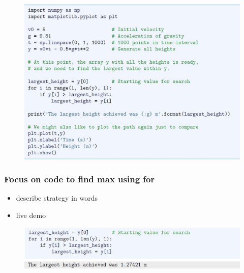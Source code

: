 \documentclass[14pt]{beamer}
\begin{document}

\begin{frame}[fragile]

\frametitle{}

\begin{figure}[ht]
	\centering
	\includegraphics[width=\textwidth]{figures/LLp71a}
\end{figure}

\end{frame}


\begin{frame}[fragile]

\frametitle{Focus on code to find max using for}

\begin{itemize}
	\item describe strategy in words
	\item live demo
\end{itemize}


\begin{figure}[ht]
	\centering
	\includegraphics[width=\textwidth]{figures/LLp71b}
	\includegraphics[width=\textwidth]{figures/LLp71c}
\end{figure}

\end{frame}
\end{document}

